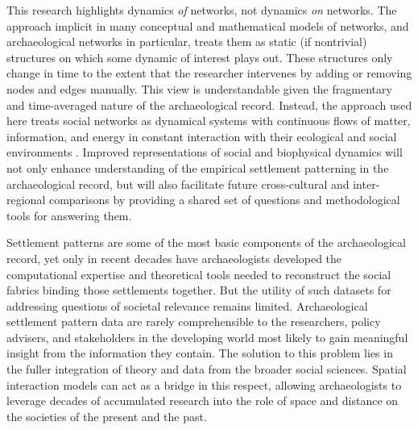 \documentclass{article}
\begin{document}
This research highlights dynamics \textit{of} networks, not dynamics \textit{on} networks. The approach implicit in many conceptual and mathematical models of networks, and archaeological networks in particular, treats them as static (if nontrivial) structures on which some dynamic of interest plays out. These structures only change in time to the extent that the researcher intervenes by adding or removing nodes and edges manually. This view is understandable given the fragmentary and time-averaged nature of the archaeological record. Instead, the approach used here treats social networks as dynamical systems with continuous flows of matter, information, and energy in constant interaction with their ecological and social environments \parencite{Brughmans2016RomanModelling,Crabtree2015}. Improved representations of social and biophysical dynamics will not only enhance understanding of the empirical settlement patterning in the archaeological record, but will also facilitate future cross-cultural and inter-regional comparisons by providing a shared set of questions and methodological tools for answering them.

Settlement patterns are some of the most basic components of the archaeological record, yet only in recent decades have archaeologists developed the computational expertise and theoretical tools needed to reconstruct the social fabrics binding those settlements together. But the utility of such datasets for addressing questions of societal relevance remains limited. Archaeological settlement pattern data are rarely comprehensible to the researchers, policy advisers, and stakeholders in the developing world most likely to gain meaningful insight from the information they contain. The solution to this problem lies in the fuller integration of theory and data from the broader social sciences. Spatial interaction models can act as a bridge in this respect, allowing archaeologists to leverage decades of accumulated research into the role of space and distance on the societies of the present and the past.

\printbibliography
\end{document}
